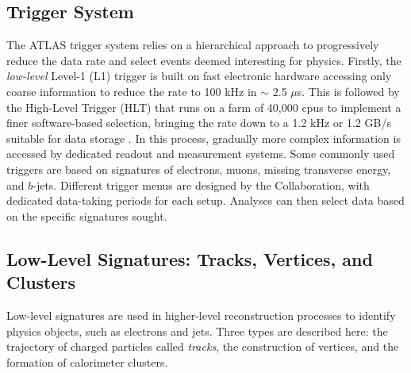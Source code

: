 \subsection{Trigger System}\label{sub-sec-trigger}
The ATLAS trigger system relies on a hierarchical approach to progressively reduce the data rate and select events deemed interesting for physics. Firstly, the \textit{low-level} Level-1 (L1) trigger is built on fast electronic hardware accessing only coarse information to reduce the rate to 100 kHz in $\sim$ 2.5 $\mu$s. This is followed by the High-Level Trigger (HLT) that runs on a farm of 40,000 \glspl{cpu} to implement a finer software-based selection, bringing the rate down to a 1.2 kHz or 1.2 GB/s suitable for data storage \cite{TriggerATLAScollaboration_2020}. In this process, gradually more complex information is accessed by dedicated readout and measurement systems. Some commonly used triggers are based on signatures of electrons, muons, missing transverse energy, and $b$-jets. Different trigger menus are designed by the Collaboration, with dedicated data-taking periods for each setup. Analyses can then select data based on the specific signatures sought. 

\subsection{Low-Level Signatures: Tracks, Vertices, and Clusters}\label{sec-atlas-lw}
Low-level signatures are used in higher-level reconstruction processes to identify physics objects, such as electrons and jets. Three types are described here: the trajectory of charged particles called \textit{tracks}, the construction of vertices, and the formation of calorimeter clusters. \\

